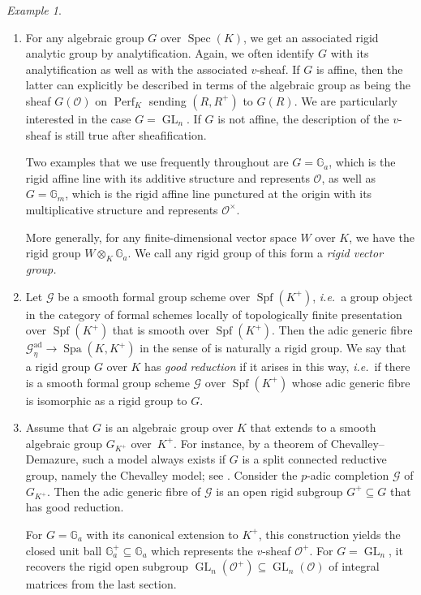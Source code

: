 \documentclass[10pt,a4paper]{article}
\theoremstyle{definition}
\theoremstyle{remark}
\newtheorem{Example}[thm]{Example}
\newcommand{\G}{\mathbb{G}}
\renewcommand{\O}{\mathcal{O}}
\newcommand{\GL}{\operatorname{GL}}
\newcommand{\Perf}{\operatorname{Perf}}
\newcommand{\Spec}{\operatorname{Spec}}
\newcommand{\Spa}{\operatorname{Spa}}
\newcommand{\ad}{\mathrm{ad}}
\newcommand{\Spf}{\operatorname{Spf}}
\newcommand{\mG}{\mathcal{G}}
\numberwithin{equation}{section}
\begin{document}
\begin{Example}\label{ex:rigid-groups}\leavevmode
	\begin{enumerate}
\item 
For any algebraic group $G$ over $\Spec(K)$, we get an associated rigid analytic group by analytification. Again, we often identify $G$ with its analytification as well as with the associated $v$-sheaf. If $G$ is affine, then the latter can explicitly be described in terms of the algebraic group as being the sheaf $G(\O)$ on $\Perf_K$ sending $(R,R^+)$ to $G(R)$. We are particularly interested in the case $G=\GL_n$. 
If $G$ is not affine, the description of the $v$-sheaf is still true after sheafification. 

Two examples that we use frequently throughout are $G=\G_a$, which is the rigid affine line with its additive structure and represents $\O$, as well as $G=\G_m$, which is the rigid affine line punctured at the origin with its multiplicative structure and represents $\O^\times$.

More generally, for any finite-dimensional vector space $W$ over $K$, we have the rigid group $W\otimes_K\G_a$. We call any rigid group of this form a \emph{rigid vector group.}
\item Let $\mG$ be a smooth formal group scheme over $\Spf(K^+)$, \textit{i.e.}~a group object in the category of formal schemes locally of topologically finite presentation over $\Spf(K^+)$ that is smooth over $\Spf(K^+)$. Then the adic generic fibre $\mathcal G^{\ad}_{\eta}\to\Spa(K,K^+)$ in the sense of \cite[Section~2.2]{ScholzeWeinstein} is naturally a rigid group. 
We say that a rigid group $G$ over $K$ has \emph{good reduction} if it arises in this way, \textit{i.e.}~if there is a smooth formal group scheme $\mathcal G$ over $\Spf(K^+)$ whose adic generic fibre  is isomorphic as a rigid group to $G$.
\item Assume that $G$ is an algebraic group over $K$ that extends to a smooth algebraic group $G_{K^+}$ over~$K^+$.  For instance, by a theorem of Chevalley--Demazure, such a model always exists if $G$ is a split connected reductive group, namely the Chevalley model; see \cite[Corollaire XXV.1.2]{SGA3}. Consider the $p$-adic completion  $\mathcal G$ of $G_{K^+}$. Then the adic generic fibre of $\mathcal G$ is an open rigid subgroup $G^+\subseteq G$ that has good reduction. 

For $G=\G_a$ with its canonical extension to $K^+$, this construction yields the closed unit ball $\G_a^+\subseteq \G_a$ which represents the $v$-sheaf $\O^+$.
For $G=\GL_n$, it recovers the rigid open subgroup $\GL_n(\O^+)\subseteq \GL_n(\O)$ of integral matrices from the last section.
\end{enumerate}
\end{Example}
\end{document}
